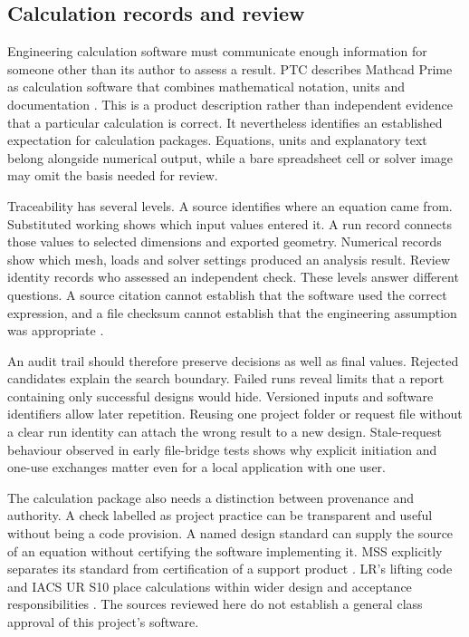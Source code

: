 \subsection{Calculation records and review}
\label{sec:lit-calculation-packages}

Engineering calculation software must communicate enough information for someone other than its author to assess a result. PTC describes Mathcad Prime as calculation software that combines mathematical notation, units and documentation \cite{ptcMathcad}. This is a product description rather than independent evidence that a particular calculation is correct. It nevertheless identifies an established expectation for calculation packages. Equations, units and explanatory text belong alongside numerical output, while a bare spreadsheet cell or solver image may omit the basis needed for review.

Traceability has several levels. A source identifies where an equation came from. Substituted working shows which input values entered it. A run record connects those values to selected dimensions and exported geometry. Numerical records show which mesh, loads and solver settings produced an analysis result. Review identity records who assessed an independent check. These levels answer different questions. A source citation cannot establish that the software used the correct expression, and a file checksum cannot establish that the engineering assumption was appropriate \cite{nasa7009,asmeVV10}.

An audit trail should therefore preserve decisions as well as final values. Rejected candidates explain the search boundary. Failed runs reveal limits that a report containing only successful designs would hide. Versioned inputs and software identifiers allow later repetition. Reusing one project folder or request file without a clear run identity can attach the wrong result to a new design. Stale-request behaviour observed in early file-bridge tests shows why explicit initiation and one-use exchanges matter even for a local application with one user.

The calculation package also needs a distinction between provenance and authority. A check labelled as project practice can be transparent and useful without being a code provision. A named design standard can supply the source of an equation without certifying the software implementing it. MSS explicitly separates its standard from certification of a support product \cite{mssInterpretations}. LR's lifting code and IACS UR S10 place calculations within wider design and acceptance responsibilities \cite{lrLifting2026,iacsS10}. The sources reviewed here do not establish a general class approval of this project's software.

